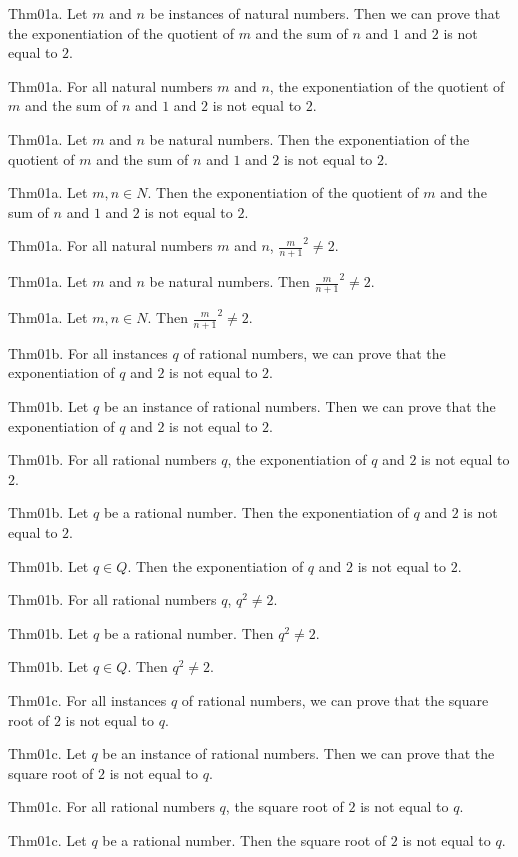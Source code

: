 \documentclass{article}
\begin{document}
Thm01a. Let $m$ and $n$ be instances of natural numbers. Then we can prove that the exponentiation of the quotient of $m$ and the sum of $n$ and $1$ and $2$ is not equal to $2$.

Thm01a. For all natural numbers $m$ and $n$, the exponentiation of the quotient of $m$ and the sum of $n$ and $1$ and $2$ is not equal to $2$.

Thm01a. Let $m$ and $n$ be natural numbers. Then the exponentiation of the quotient of $m$ and the sum of $n$ and $1$ and $2$ is not equal to $2$.

Thm01a. Let $m , n \in N$. Then the exponentiation of the quotient of $m$ and the sum of $n$ and $1$ and $2$ is not equal to $2$.

Thm01a. For all natural numbers $m$ and $n$, ${\frac{ m }{ n + 1}}^{ 2}\neq 2$.

Thm01a. Let $m$ and $n$ be natural numbers. Then ${\frac{ m }{ n + 1}}^{ 2}\neq 2$.

Thm01a. Let $m , n \in N$. Then ${\frac{ m }{ n + 1}}^{ 2}\neq 2$.

Thm01b. For all instances $q$ of rational numbers, we can prove that the exponentiation of $q$ and $2$ is not equal to $2$.

Thm01b. Let $q$ be an instance of rational numbers. Then we can prove that the exponentiation of $q$ and $2$ is not equal to $2$.

Thm01b. For all rational numbers $q$, the exponentiation of $q$ and $2$ is not equal to $2$.

Thm01b. Let $q$ be a rational number. Then the exponentiation of $q$ and $2$ is not equal to $2$.

Thm01b. Let $q \in Q$. Then the exponentiation of $q$ and $2$ is not equal to $2$.

Thm01b. For all rational numbers $q$, ${q }^{ 2}\neq 2$.

Thm01b. Let $q$ be a rational number. Then ${q }^{ 2}\neq 2$.

Thm01b. Let $q \in Q$. Then ${q }^{ 2}\neq 2$.

Thm01c. For all instances $q$ of rational numbers, we can prove that the square root of $2$ is not equal to $q$.

Thm01c. Let $q$ be an instance of rational numbers. Then we can prove that the square root of $2$ is not equal to $q$.

Thm01c. For all rational numbers $q$, the square root of $2$ is not equal to $q$.

Thm01c. Let $q$ be a rational number. Then the square root of $2$ is not equal to $q$.
\end{document}
